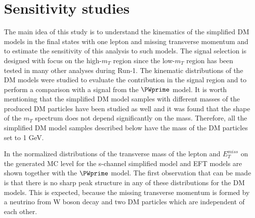 


















\section{Sensitivity studies}

The main idea of this study is to understand the kinematics of the simplified DM models in the final states with one lepton and missing transverse momentum and to estimate the sensitivity of this analysis to such models.
The signal selection is designed with focus on the high-$m_{T}$ region 
since the low-$m_T$ region has been tested in many other analyses during Run-1.
The kinematic distributions of the DM models were studied to evaluate the contribution in the signal region and to perform a comparison with a signal from the $\PWprime$ model.
It is worth mentioning that the simplified DM model samples with different masses of the produced DM particles have been studied as well and it was found that the shape of the $m_T$ spectrum does not depend significantly on the mass. Therefore, all the simplified DM model samples described below have the mass of the DM particles set to 1 GeV.

In  the normalized distributions of the transverse mass of the lepton and $E_{T}^{miss}$ on the generated MC level
for the s-channel simplified model and EFT models are shown together with the $\PWprime$ model.
The first observation that can be made is that there is no sharp peak structure in any of these distributions for the DM models.
This is expected, because the missing transverse momentum is formed by
a neutrino from W boson decay and two DM particles which are independent of each other. 

